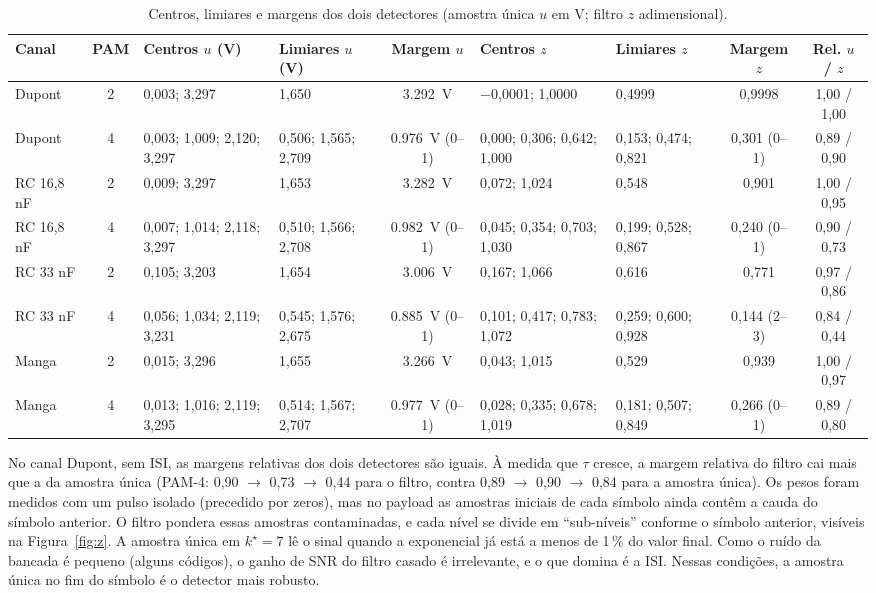 \documentclass[12pt,a4paper]{article}
\begin{document}
\begin{table}[H]
\centering
\caption{Centros, limiares e margens dos dois detectores (amostra única $u$ em V; filtro $z$ adimensional).}
\label{tab:centros}
\scriptsize
\setlength{\tabcolsep}{3pt}
\begin{tabular}{l c l l c l l c c}
\toprule
Canal & PAM & Centros $u$ (V) & Limiares $u$ (V) & Margem $u$ & Centros $z$ & Limiares $z$ & Margem $z$ & Rel. $u$ / $z$ \\
\midrule
Dupont & 2 & 0,003; 3,297 & 1,650 & \SI{3,292}{V} & $-$0,0001; 1,0000 & 0,4999 & 0,9998 & 1,00 / 1,00 \\
Dupont & 4 & 0,003; 1,009; 2,120; 3,297 & 0,506; 1,565; 2,709 & \SI{0,976}{V} (0--1) & 0,000; 0,306; 0,642; 1,000 & 0,153; 0,474; 0,821 & 0,301 (0--1) & 0,89 / 0,90 \\
RC 16,8 nF & 2 & 0,009; 3,297 & 1,653 & \SI{3,282}{V} & 0,072; 1,024 & 0,548 & 0,901 & 1,00 / 0,95 \\
RC 16,8 nF & 4 & 0,007; 1,014; 2,118; 3,297 & 0,510; 1,566; 2,708 & \SI{0,982}{V} (0--1) & 0,045; 0,354; 0,703; 1,030 & 0,199; 0,528; 0,867 & 0,240 (0--1) & 0,90 / 0,73 \\
RC 33 nF & 2 & 0,105; 3,203 & 1,654 & \SI{3,006}{V} & 0,167; 1,066 & 0,616 & 0,771 & 0,97 / 0,86 \\
RC 33 nF & 4 & 0,056; 1,034; 2,119; 3,231 & 0,545; 1,576; 2,675 & \SI{0,885}{V} (0--1) & 0,101; 0,417; 0,783; 1,072 & 0,259; 0,600; 0,928 & 0,144 (2--3) & 0,84 / 0,44 \\
Manga & 2 & 0,015; 3,296 & 1,655 & \SI{3,266}{V} & 0,043; 1,015 & 0,529 & 0,939 & 1,00 / 0,97 \\
Manga & 4 & 0,013; 1,016; 2,119; 3,295 & 0,514; 1,567; 2,707 & \SI{0,977}{V} (0--1) & 0,028; 0,335; 0,678; 1,019 & 0,181; 0,507; 0,849 & 0,266 (0--1) & 0,89 / 0,80 \\
\bottomrule
\end{tabular}
\end{table}

No canal Dupont, sem ISI, as margens relativas dos dois detectores são iguais. À medida que $\tau$
cresce, a margem relativa do filtro cai mais que a da amostra única (PAM-4: 0,90 $\to$ 0,73 $\to$ 0,44
para o filtro, contra 0,89 $\to$ 0,90 $\to$ 0,84 para a amostra única). Os pesos foram medidos com um
pulso isolado (precedido por zeros), mas no payload as amostras iniciais de cada símbolo ainda contêm
a cauda do símbolo anterior. O filtro pondera essas amostras contaminadas, e cada nível se divide em
``sub-níveis'' conforme o símbolo anterior, visíveis na Figura~\ref{fig:z}. A amostra única em
$k^\star = 7$ lê o sinal quando a exponencial já está a menos de 1\,\% do valor final. Como o ruído
da bancada é pequeno (alguns códigos), o ganho de SNR do filtro casado é irrelevante, e o que domina é a
ISI. Nessas condições, a amostra única no fim do símbolo é o detector mais robusto.
\end{document}
